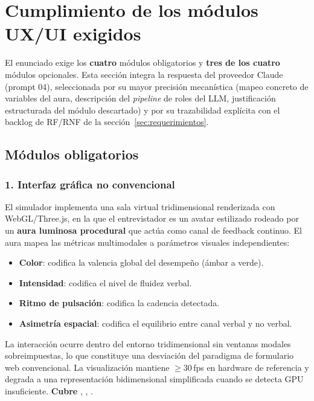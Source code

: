\section{Cumplimiento de los módulos UX/UI exigidos}
\label{sec:modulos}

El enunciado exige los \textbf{cuatro} módulos obligatorios y \textbf{tres
de los cuatro} módulos opcionales. Esta sección integra la respuesta del
proveedor Claude (prompt 04), seleccionada por su mayor precisión
mecanística (mapeo concreto de variables del aura, descripción del
\textit{pipeline} de roles del LLM, justificación estructurada del
módulo descartado) y por su trazabilidad explícita con el backlog de
RF/RNF de la sección~\ref{sec:requerimientos}.

\subsection{Módulos obligatorios}

\subsubsection{1. Interfaz gráfica no convencional}
El simulador implementa una sala virtual tridimensional renderizada con
WebGL/Three.js, en la que el entrevistador es un avatar estilizado
rodeado por un \textbf{aura luminosa procedural} que actúa como canal de
feedback continuo. El aura mapea las métricas multimodales a parámetros
visuales independientes:

\begin{itemize}
  \item \textbf{Color}: codifica la valencia global del desempeño
        (ámbar a verde).
  \item \textbf{Intensidad}: codifica el nivel de fluidez verbal.
  \item \textbf{Ritmo de pulsación}: codifica la cadencia detectada.
  \item \textbf{Asimetría espacial}: codifica el equilibrio entre canal
        verbal y no verbal.
\end{itemize}

\noindent La interacción ocurre dentro del entorno tridimensional sin
ventanas modales sobreimpuestas, lo que constituye una desviación del
paradigma de formulario web convencional. La visualización mantiene
$\ge 30$\,fps en hardware de referencia y degrada a una representación
bidimensional simplificada cuando se detecta GPU insuficiente.
\textbf{Cubre} , , .

